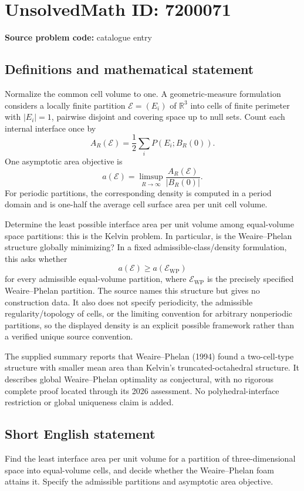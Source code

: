 \documentclass[11pt]{article}
\begin{document}
\section*{UnsolvedMath ID: 7200071}
\textbf{Source problem code:} catalogue entry
\subsection{Definitions and mathematical statement}
Normalize the common cell volume to one. A geometric-measure formulation considers a locally finite partition $\mathcal E=(E_i)$ of $\mathbb R^3$ into cells of finite perimeter with $|E_i|=1$, pairwise disjoint and covering space up to null sets. Count each internal interface once by
\[
A_R(\mathcal E)=\frac12\sum_i P(E_i;B_R(0)).
\]
One asymptotic area objective is
\[
a(\mathcal E)=\limsup_{R\to\infty}\frac{A_R(\mathcal E)}{|B_R(0)|}.
\]
For periodic partitions, the corresponding density is computed in a period domain and is one-half the average cell surface area per unit cell volume.

Determine the least possible interface area per unit volume among equal-volume space partitions: this is the Kelvin problem. In particular, is the Weaire--Phelan structure globally minimizing? In a fixed admissible-class/density formulation, this asks whether
\[
a(\mathcal E)\geq a(\mathcal E_{\mathrm{WP}})
\]
for every admissible equal-volume partition, where $\mathcal E_{\mathrm{WP}}$ is the precisely specified Weaire--Phelan partition. The source names this structure but gives no construction data. It also does not specify periodicity, the admissible regularity/topology of cells, or the limiting convention for arbitrary nonperiodic partitions, so the displayed density is an explicit possible framework rather than a verified unique source convention.

The supplied summary reports that Weaire--Phelan (1994) found a two-cell-type structure with smaller mean area than Kelvin's truncated-octahedral structure. It describes global Weaire--Phelan optimality as conjectural, with no rigorous complete proof located through its 2026 assessment. No polyhedral-interface restriction or global uniqueness claim is added.
\subsection{Short English statement}
Find the least interface area per unit volume for a partition of three-dimensional space into equal-volume cells, and decide whether the Weaire--Phelan foam attains it. Specify the admissible partitions and asymptotic area objective.
\end{document}
